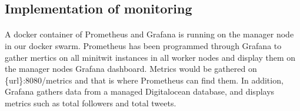 \subsection{Implementation of monitoring} 
\paragraph{} A docker container of Prometheus and Grafana is running on the manager node in our docker swarm. Prometheus has been programmed through Grafana to gather mertics on all minitwit instances in all worker nodes and display them on the manager nodes Grafana dashboard. Metrics would be gathered on \{url\}:8080/metrics and that is where Prometheus can find them. In addition, Grafana gathers data from a managed Digitalocean database, and displays metrics such as total followers and total tweets.
